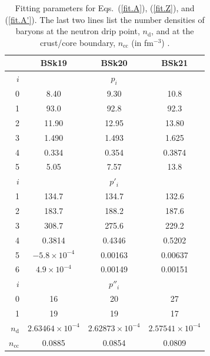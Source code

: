 \documentclass{aa}
\newcommand{\nc}{n_\mathrm{cc}}
\newcommand{\nd}{n_\mathrm{d}}
\begin{document}
\begin{table}
\centering
\caption[]{Fitting
parameters for Eqs.~(\ref{fit.A}),  (\ref{fit.Z}), and
(\ref{fit.A'}). The last two lines list
the number densities of baryons
at the neutron drip point,
$\nd$, and
at the crust/core boundary, $\nc$ (in fm$^{-3}$)
\citep{Pearson-ea12}.}
\label{tab:fit.A}
\begin{tabular}{r|ccc}
\hline\hline\rule[-1.4ex]{0pt}{4.3ex}
  & BSk19 & BSk20 & BSk21  \\
\hline\rule[-1.4ex]{0pt}{3.7ex}
$i$ & \multicolumn{3}{c}{$p_i$}\\
0 & 8.40 & 9.30 & 10.8 \\
1 & 93.0 & 92.8 & 92.3 \\
2 & 11.90 & 12.95 & 13.80 \\
3 & 1.490 & 1.493 & 1.625 \\
4 & 0.334 & 0.354 & 0.3874 \\
5 & 5.05 & 7.57 & 13.8 \\
\hline\rule[-1.4ex]{0pt}{3.7ex}
$i$ & \multicolumn{3}{c}{$p'_i$}\\
1 & 134.7 & 134.7 & 132.6 \\
2 & 183.7 & 188.2 & 187.6 \\
3 & 308.7 & 275.6 & 229.2 \\
4 & 0.3814 & 0.4346 & 0.5202 \\
5 & $-5.8\times10^{-4}$ & 0.00163 & 0.00637 \\
6 & $4.9\times10^{-4}$ & 0.00149 & 0.00151 \\
\hline\rule[-1.4ex]{0pt}{3.7ex}
$i$ & \multicolumn{3}{c}{$p''_i$}\\
0 & 16 & 20 & 27 \\
1 & 19 & 19 & 17 \\
\hline\rule[-1.4ex]{0pt}{3.7ex}
$\nd$ & $2.63464\times10^{-4}$ &
$2.62873\times10^{-4}$ & $2.57541\times10^{-4}$ \\
$\nc$ & 0.0885 & 0.0854 & 0.0809 \\
\hline\hline
\end{tabular}
\end{table}
\end{document}

